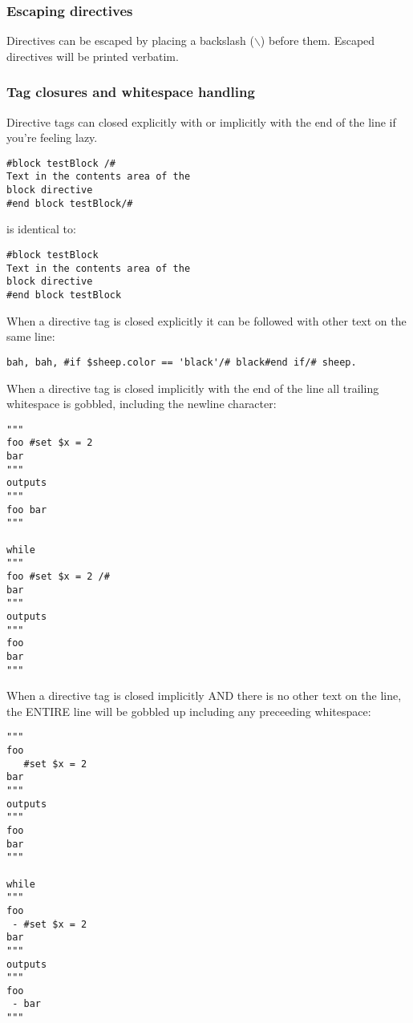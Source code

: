 \subsubsection{Escaping directives}
\label{TDL.directives.escaping}

Directives can be escaped by placing a backslash ($\backslash$) before them.
Escaped directives will be printed verbatim.

\subsubsection{Tag closures and whitespace handling}
\label{TDL.directives.closures}
Directive tags can closed explicitly with \code{/\#} or implicitly with the end
of the line if you're feeling lazy.

\begin{verbatim}
#block testBlock /#
Text in the contents area of the
block directive
#end block testBlock/#
\end{verbatim}
is identical to:
\begin{verbatim}
#block testBlock
Text in the contents area of the
block directive
#end block testBlock
\end{verbatim}

When a directive tag is closed explicitly it can be followed with other text on
the same line:

\begin{verbatim}
bah, bah, #if $sheep.color == 'black'/# black#end if/# sheep.
\end{verbatim}

When a directive tag is closed implicitly with the end of the line all trailing
whitespace is gobbled, including the newline character:
\begin{verbatim}
"""
foo #set $x = 2 
bar
"""
outputs 
"""
foo bar
"""

while 
"""
foo #set $x = 2 /#
bar
"""
outputs 
"""
foo 
bar
"""
\end{verbatim}

When a directive tag is closed implicitly AND there is no other text on the
line, the ENTIRE line will be gobbled up including any preceeding whitespace:
\begin{verbatim}
"""
foo 
   #set $x = 2 
bar
"""
outputs 
"""
foo
bar
"""

while 
"""
foo 
 - #set $x = 2
bar
"""
outputs 
"""
foo 
 - bar
"""
\end{verbatim}

